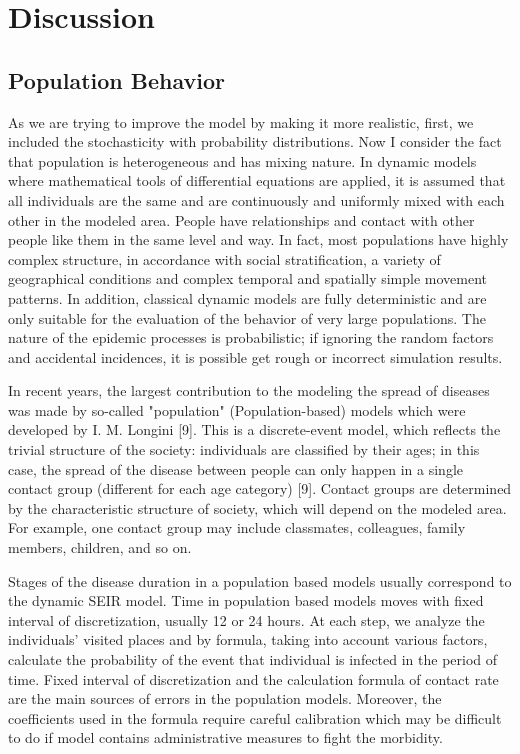 \chapter{Discussion}


\section{Population Behavior}

As we are trying to improve the model by making it more realistic, first, we included the stochasticity with probability distributions. Now I consider the fact that population is heterogeneous and has mixing nature. In dynamic models where mathematical tools of differential equations are applied, it is assumed that all individuals are the same and are continuously and uniformly mixed with each other in the modeled area. People have relationships and contact with other people like them in the same level and way. In fact, most populations have highly complex structure, in accordance with social stratification, a variety of geographical conditions and complex temporal and spatially simple movement patterns. In addition, classical dynamic models are fully deterministic and are only suitable for the evaluation of the behavior of very large populations. The nature of the epidemic processes is probabilistic; if ignoring the random factors and accidental incidences, it is possible get rough or incorrect simulation results.

In recent years, the largest contribution to the modeling the spread of diseases was made by so-called "population" (Population-based) models which were developed by I. M. Longini [9]. This is a discrete-event model, which reflects the trivial structure of the society: individuals are classified by their ages; in this case, the spread of the disease between people can only happen in a single contact group (different for each age category) [9]. Contact groups are determined by the characteristic structure of society, which will depend on the modeled area. For example, one contact group may include classmates, colleagues, family members, children, and so on.

Stages of the disease duration in a population based models usually correspond to the dynamic SEIR model. Time in population based models moves with fixed interval of discretization, usually 12 or 24 hours. At each step, we analyze the individuals’ visited places and by formula, taking into account various factors, calculate the probability of the event that individual is infected in the period of time.  Fixed interval of discretization and the calculation formula of contact rate are the main sources of errors in the population models. Moreover, the coefficients used in the formula require careful calibration which may be difficult to do if model contains administrative measures to fight the morbidity.

